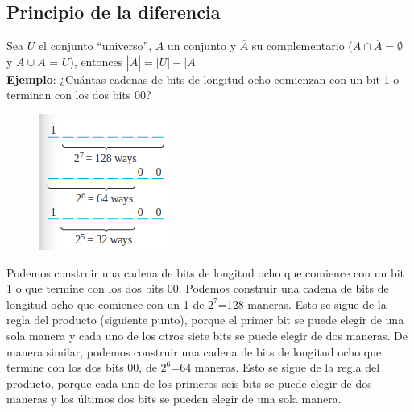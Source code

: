 \documentclass{article}
\begin{document}
\newpage

\subsection{Principio de la diferencia}
Sea $U$ el conjunto “universo”, $A$ un conjunto y $\overline{A}$ su complementario ($A \cap \overline{A} = \emptyset$ y $A \cup \overline{A}$ = $U$), entonces $|\overline{A}| = |U| - |A|$ \\
\textbf{Ejemplo}: ¿Cuántas cadenas de bits de longitud ocho comienzan con un bit 1 o terminan con los dos bits 00? \\

\begin{figure}
    \centering
    \includegraphics[width=\linewidth]{img-t2/img_192_46.png}
\end{figure}

Podemos construir una cadena de bits de longitud ocho que comience con un bit 1 o que termine con los dos bits 00. Podemos construir una cadena de bits de longitud ocho que comience con un 1 de $2^7$=128 maneras. Esto se sigue de la regla del producto (siguiente punto), porque el primer bit se puede elegir de una sola manera y cada uno de los otros siete bits se puede elegir de dos maneras. De manera similar, podemos construir una cadena de bits de longitud ocho que termine con los dos bits 00, de $2^6$=64 maneras. Esto se sigue de la regla del producto, porque cada uno de los primeros seis bits se puede elegir de dos maneras y los últimos dos bits se pueden elegir de una sola manera.\\
\end{document}
